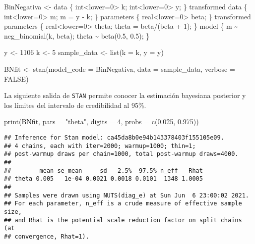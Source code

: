 \documentclass[
  10pt,
  spanish,
]{book}
\newenvironment{Shaded}{\begin{snugshade}}{\end{snugshade}}
\newcommand{\AttributeTok}[1]{\textcolor[rgb]{0.77,0.63,0.00}{#1}}
\newcommand{\ConstantTok}[1]{\textcolor[rgb]{0.00,0.00,0.00}{#1}}
\newcommand{\DecValTok}[1]{\textcolor[rgb]{0.00,0.00,0.81}{#1}}
\newcommand{\FloatTok}[1]{\textcolor[rgb]{0.00,0.00,0.81}{#1}}
\newcommand{\FunctionTok}[1]{\textcolor[rgb]{0.00,0.00,0.00}{#1}}
\newcommand{\NormalTok}[1]{#1}
\newcommand{\OtherTok}[1]{\textcolor[rgb]{0.56,0.35,0.01}{#1}}
\newcommand{\StringTok}[1]{\textcolor[rgb]{0.31,0.60,0.02}{#1}}
\theoremstyle{definition}
\theoremstyle{definition}
\theoremstyle{definition}
\theoremstyle{definition}
\theoremstyle{remark}
\begin{document}
\begin{Shaded}
\begin{Highlighting}[]
\NormalTok{BinNegativa }\OtherTok{\textless{}{-}} \StringTok{\textquotesingle{}data \{}
\StringTok{  int\textless{}lower=0\textgreater{} k;}
\StringTok{  int\textless{}lower=0\textgreater{} y;}
\StringTok{\}}
\StringTok{transformed data \{}
\StringTok{  int\textless{}lower=0\textgreater{} m;}
\StringTok{  m = y {-} k;}
\StringTok{\}}
\StringTok{parameters \{}
\StringTok{  real\textless{}lower=0\textgreater{} beta;}
\StringTok{\}}
\StringTok{transformed parameters \{}
\StringTok{  real\textless{}lower=0\textgreater{} theta;}
\StringTok{  theta = beta/(beta + 1);}
\StringTok{\}}
\StringTok{model \{}
\StringTok{  m \textasciitilde{} neg\_binomial(k, beta);}
\StringTok{  theta \textasciitilde{} beta(0.5, 0.5);}
\StringTok{\}}
\StringTok{\textquotesingle{}}

\NormalTok{y }\OtherTok{\textless{}{-}} \DecValTok{1106}
\NormalTok{k }\OtherTok{\textless{}{-}} \DecValTok{5}
\NormalTok{sample\_data }\OtherTok{\textless{}{-}} \FunctionTok{list}\NormalTok{(}\AttributeTok{k =}\NormalTok{ k, }\AttributeTok{y =}\NormalTok{ y)}

\NormalTok{BNfit }\OtherTok{\textless{}{-}} \FunctionTok{stan}\NormalTok{(}\AttributeTok{model\_code =}\NormalTok{ BinNegativa,}
              \AttributeTok{data =}\NormalTok{ sample\_data, }\AttributeTok{verbose =} \ConstantTok{FALSE}\NormalTok{)}
\end{Highlighting}
\end{Shaded}

La siguiente salida de \texttt{STAN} permite conocer la estimación bayesiana posterior y los límites del intervalo de credibilidad al 95\%.

\begin{Shaded}
\begin{Highlighting}[]
\FunctionTok{print}\NormalTok{(BNfit, }\AttributeTok{pars =} \StringTok{"theta"}\NormalTok{, }
      \AttributeTok{digits =} \DecValTok{4}\NormalTok{, }\AttributeTok{probs =} \FunctionTok{c}\NormalTok{(}\FloatTok{0.025}\NormalTok{, }\FloatTok{0.975}\NormalTok{))}
\end{Highlighting}
\end{Shaded}

\begin{verbatim}
## Inference for Stan model: ca45da8b0e94b143378403f155105e09.
## 4 chains, each with iter=2000; warmup=1000; thin=1; 
## post-warmup draws per chain=1000, total post-warmup draws=4000.
## 
##        mean se_mean     sd   2.5%  97.5% n_eff   Rhat
## theta 0.005   1e-04 0.0021 0.0018 0.0101  1348 1.0005
## 
## Samples were drawn using NUTS(diag_e) at Sun Jun  6 23:00:02 2021.
## For each parameter, n_eff is a crude measure of effective sample size,
## and Rhat is the potential scale reduction factor on split chains (at 
## convergence, Rhat=1).
\end{verbatim}
\end{document}
